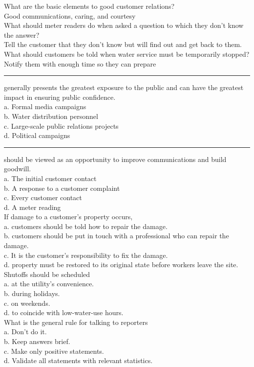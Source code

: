 What are the basic elements to good customer relations?\\
Good communications, caring, and courtesy\\
What should meter readers do when asked a question to which they don't know the answer?\\
Tell the customer that they don't know but will find out and get back to them.\\
What should customers be told when water service must be temporarily stopped?\\
Notify them with enough time so they can prepare\\
\rule{1.2cm}{0.1pt}generally presents the greatest exposure to the public and can have the greatest impact in ensuring public confidence.\\
a.	Formal media campaigns\\
b.	Water distribution personnel\\
c.	Large-scale public relations projects\\
d.	Political campaigns\\
\rule{1.2cm}{0.1pt}should be viewed as an opportunity to improve communications and build goodwill.\\
a.	The initial customer contact\\
b.	A response to a customer complaint\\
c.	Every customer contact\\
d.	A meter reading\\
If damage to a customer's property occurs,\\
a.	customers should be told how to repair the damage.\\
b.	customers should be put in touch with a professional who can repair the damage.\\
c.	It is the customer's responsibility to fix the damage.\\
d.	property must be restored to its original state before workers leave the site.\\
Shutoffs should be scheduled\\
a.	at the utility's convenience.\\
b.	during holidays.\\
c.	on weekends.\\
d.	to coincide with low-water-use hours.\\
What is the general rule for talking to reporters\\
a.	Don't do it.\\
b.	Keep answers brief.\\
c.	Make only positive statements.\\
d.	Validate all statements with relevant statistics.\\
